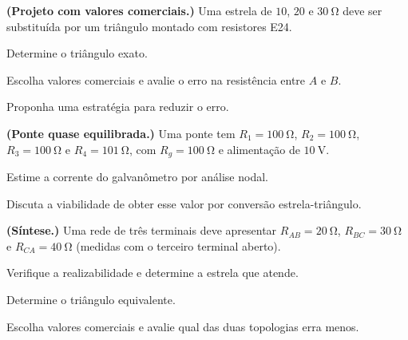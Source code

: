 \begin{questao}[4]{}

\textbf{(Projeto com valores comerciais.)} Uma estrela de $10$, $20$ e
$\SI{30}{\ohm}$ deve ser substituída por um triângulo montado com resistores
E24.
\begin{itensq}
\item Determine o triângulo exato.
\item Escolha valores comerciais e avalie o erro na resistência entre $A$ e
      $B$.
\item Proponha uma estratégia para reduzir o erro.
\end{itensq}


\end{questao}
\begin{questao}[4]{}

\textbf{(Ponte quase equilibrada.)} Uma ponte tem $R_1=\SI{100}{\ohm}$,
$R_2=\SI{100}{\ohm}$, $R_3=\SI{100}{\ohm}$ e
$R_4=\SI{101}{\ohm}$, com $R_g=\SI{100}{\ohm}$ e alimentação de
$\SI{10}{\volt}$.
\begin{itensq}
\item Estime a corrente do galvanômetro por análise nodal.
\item Discuta a viabilidade de obter esse valor por conversão
      estrela-triângulo.
\end{itensq}


\end{questao}
\begin{questao}[4]{}

\textbf{(Síntese.)} Uma rede de três terminais deve apresentar
$R_{AB}=\SI{20}{\ohm}$, $R_{BC}=\SI{30}{\ohm}$ e $R_{CA}=\SI{40}{\ohm}$
(medidas com o terceiro terminal aberto).
\begin{itensq}
\item Verifique a realizabilidade e determine a estrela que atende.
\item Determine o triângulo equivalente.
\item Escolha valores comerciais e avalie qual das duas topologias erra menos.
\end{itensq}


\end{questao}
